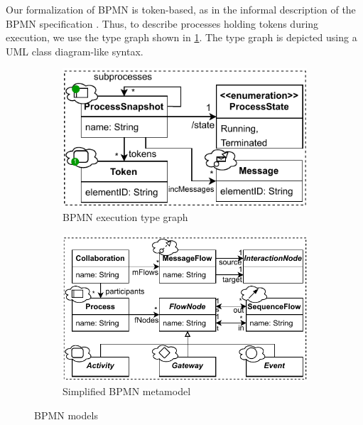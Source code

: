 \documentclass[submission, copyright, creativecommons]{eptcs}
\begin{document}
Our formalization of BPMN is token-based, as in the informal description of the BPMN specification \cite{objectmanagementgroupBusinessProcessModel2013}.
Thus, to describe processes holding tokens during execution, we use the type graph shown in \cref{fig:typeGraph}.
The type graph is depicted using a UML class diagram-like syntax.

\begin{figure}
\centering
\begin{subfigure}{.5\textwidth}
  \centering
  \includegraphics[width=1\linewidth]{images/bpmn_semantics-typegraph.pdf}
  \caption{BPMN execution type graph}
  \label{fig:typeGraph}
\end{subfigure}%
\begin{subfigure}{.50\textwidth}
  \centering
  \includegraphics[width=1\linewidth]{images/bpmn_semantics-bpmn-metamodel.pdf}
  \caption{Simplified BPMN metamodel \cite{objectmanagementgroupBusinessProcessModel2013}}
  \label{fig:bpmnMetamodel}
\end{subfigure}
\caption{BPMN models}
\label{fig:bpmnModels}
\end{figure}
\end{document}
